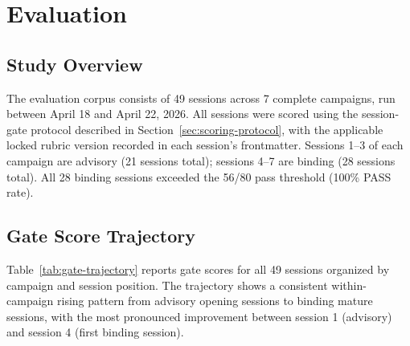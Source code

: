 
\section{Evaluation}
\label{sec:evaluation}

\subsection{Study Overview}

The evaluation corpus consists of 49 sessions across 7 complete campaigns, run between
April 18 and April 22, 2026. All sessions were scored using the session-gate protocol
described in Section~\ref{sec:scoring-protocol}, with the applicable locked rubric
version recorded in each session's frontmatter. Sessions 1--3 of each campaign are
advisory (21 sessions total); sessions 4--7 are binding (28 sessions total). All 28
binding sessions exceeded the 56/80 pass threshold (100\% PASS rate).

\subsection{Gate Score Trajectory}

Table~\ref{tab:gate-trajectory} reports gate scores for all 49 sessions organized by
campaign and session position. The trajectory shows a consistent within-campaign
rising pattern from advisory opening sessions to binding mature sessions, with the
most pronounced improvement between session 1 (advisory) and session 4 (first binding
session).


